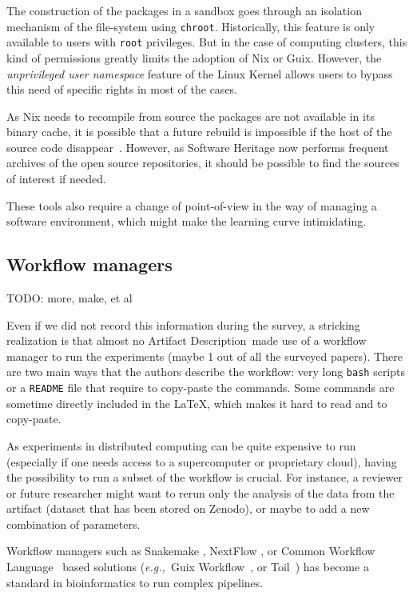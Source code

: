 \documentclass[sigconf]{acmart}
\newcommand{\eg}{\emph{e.g.,}}
\newcommand{\ad}{Artifact Description}
\newcommand{\todo}[1]{{\color{red}TODO: #1}}
\begin{document}
The construction of the packages in a sandbox goes through an isolation mechanism of the file-system using \texttt{chroot}.
Historically, this feature is only available to users with \texttt{root} privileges.
But in the case of computing clusters, this kind of permissions greatly limits the adoption of Nix or Guix.
However, the \emph{unprivileged user namespace} feature of the Linux Kernel allows users to bypass this need of specific rights in most of the cases.

As Nix needs to recompile from source the packages are not available in its binary cache, it is possible that a future rebuild is impossible if the host of the source code disappear\ \cite{blinry}.
However, as Software Heritage now performs frequent archives of the open source repositories, it should be possible to find the sources of interest if needed.

These tools also require a change of point-of-view in the way of managing a software environment, which might make the learning curve intimidating.


\subsection{Workflow managers}\label{sec:sop:workflow}

\todo{more, make, et al}

Even if we did not record this information during the survey, a stricking realization is that almost no \ad\ made use of a workflow manager to run the experiments (maybe 1 out of all the  surveyed papers).
There are two main ways that the authors describe the workflow: very long \texttt{bash} scripts or a \texttt{README} file that require to copy-paste the commands.
Some commands are sometime directly included in the LaTeX, which makes it hard to read and to copy-paste.

As experiments in distributed computing can be quite expensive to run (especially if one needs access to a supercomputer or proprietary cloud), having the possibility to run a subset of the workflow is crucial.
For instance, a reviewer or future researcher might want to rerun only the analysis of the data from the artifact (dataset that has been stored on Zenodo), or maybe to add a new combination of parameters. 

Workflow managers \cite{wratten2021reproducible} such as Snakemake \cite{koster2012snakemake}, NextFlow \cite{di2017nextflow}, or Common Workflow Language\ \cite{amstutz2016common} based solutions (\eg\ Guix Workflow\ \cite{strozzi2019scalable}, or Toil\ \cite{vivian2017toil}) has become a standard in bioinformatics to run complex pipelines.
\end{document}
